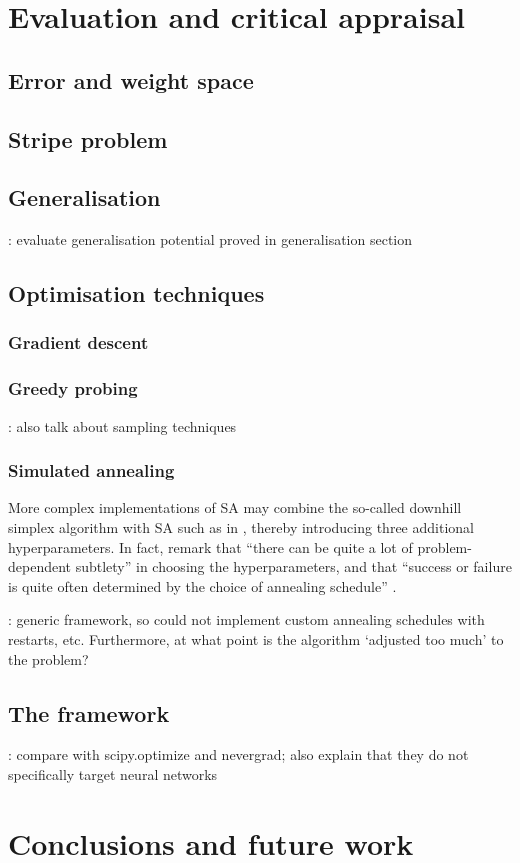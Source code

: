 \chapter{Evaluation and critical appraisal}

\section{Error and weight space}
\todo

\section{Stripe problem}
\todo

\section{Generalisation}
\todo: evaluate generalisation potential proved in generalisation section

\section{Optimisation techniques}
\subsection{Gradient descent}
\todo
\subsection{Greedy probing}
\todo: also talk about sampling techniques
\subsection{Simulated annealing}
\label{sec:eval_sim_annealing}
More complex implementations of SA may combine the so-called downhill simplex algorithm \cite{nelder1965} with SA such as in \textcite[p. 444-455]{press1992}, thereby introducing three additional hyperparameters.
In fact, \citeauthor{press1992} remark that ``there can be quite a lot of problem-dependent subtlety'' in choosing the hyperparameters, and that ``success or failure is quite often determined by the choice of annealing schedule'' \cite*[p. 452]{press1992}.

\todo: generic framework, so could not implement custom annealing schedules with restarts, etc.
Furthermore, at what point is the algorithm `adjusted too much' to the problem?

\section{The framework}
\todo: compare with scipy.optimize and nevergrad; also explain that they do not specifically target neural networks

\chapter{Conclusions and future work}
\todo